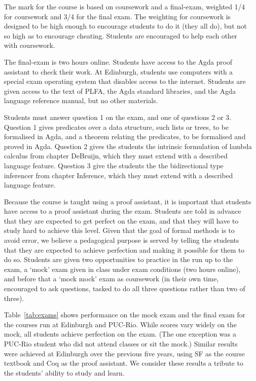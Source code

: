 \documentclass[preprint,authoryear]{elsarticle}
\begin{document}
The mark for the course is based on coursework and a final-exam,
weighted 1/4 for coursework and 3/4 for the final exam.  The weighting
for coursework is designed to be high enough to encourage students to
do it (they all do), but not so high as to encourage cheating.
Students are encouraged to help each other with coursework.

The final-exam is two hours online. Students have access to the Agda
proof assistant to check their work.  At Edinburgh, students use
computers with a special exam operating system that disables access
to the internet.  Students are given access to the text of PLFA,
the Agda standard libraries, and the Agda language reference manual,
but no other materials.

Students must answer question 1 on the exam, and one of questions 2 or
3.  Question 1 gives predicates over a data structure, such lists or
trees, to be formalised in Agda, and a theorem relating the
predicates, to be formalised and proved in Agda.  Question 2 gives the
students the intrinsic formulation of lambda calculus from chapter
DeBruijn, which they must extend with a described language feature.
Question 3 give the students the the bidirectional type inferencer
from chapter Inference, which they must extend with a described
language feature.

Because the course is taught using a proof assistant, it is important
that students have access to a proof assistant during the exam.
Students are told in advance that they are expected to get perfect on
the exam, and that they will have to study hard to achieve this level.
Given that the goal of formal methods is to avoid error, we believe a
pedagogical purpose is served by telling the students that they are
expected to achieve perfection and making it possible for them to do
so.  Students are given two opportunities to practice in the run up to
the exam, a `mock' exam given in class under exam conditions (two
hours online), and before that a `mock mock' exam as coursework (in
their own time, encouraged to ask questions, tasked to do all three
questions rather than two of three).

Table~\ref{tab:exams} shows performance on the mock exam and the final
exam for the courses run at Edinburgh and PUC-Rio.  While scores vary
widely on the mock, all students achieve perfection on the
exam.  (The one exception was a PUC-Rio student who did not attend
classes or sit the mock.)  Similar results were achieved at Edinburgh
over the previous five years, using SF as the course textbook and Coq
as the proof assistant.  We consider these results a tribute to the
students' ability to study and learn.
\end{document}
